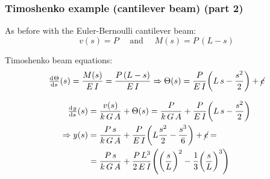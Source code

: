 \begin{frame}
  \frametitle{Timoshenko example (cantilever beam) (part 2)}
  
  As before with the Euler-Bernoulli cantilever beam:
  \begin{displaymath}
    v(s) = P \quad \text{ and } \quad M(s) = P \, (L-s)
  \end{displaymath}
  
  Timoshenko beam equations:
  \begin{displaymath}
    \od{\Theta}{s}(s) = \frac{M(s)}{E \, I} = \frac{P \, (L-s)}{E \, I} \Rightarrow
    \Theta(s) = \frac{P}{E \, I} \biggl( L \, s - \frac{s^2}{2} \biggr) + \cancel{c}
  \end{displaymath}
  
  \begin{displaymath}
    \begin{alignedat}{1}
      \od{y}{s}(s) &= \frac{v(s)}{k \, G \, A} + \Theta(s) = \frac{P}{k \, G \, A} + \frac{P}{E \, I} \biggl( L \, s - \frac{s^2}{2} \biggr) \\
      \Rightarrow y(s) &= \frac{P \, s}{k \, G \, A} + \frac{P}{E \, I} \biggl( L \frac{s^2}{2} - \frac{s^3}{6} \biggr) + \cancel{c} = \\
      &= \frac{P \, s}{k \, G \, A} + \frac{P \, L^3}{2 \, E \, I} \Biggl( 
      \biggl( \frac{s}{L} \biggr)^2 - \frac{1}{3} \biggl( \frac{s}{L} \biggr)^3 \Biggr)
    \end{alignedat}
  \end{displaymath}
\end{frame}


